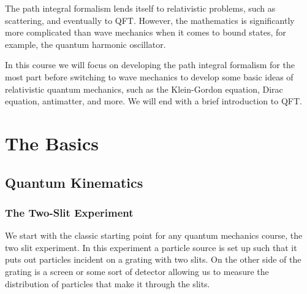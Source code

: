 \documentclass[fleqn]{NotesClass}
\begin{document}
    The path integral formalism lends itself to relativistic problems, such as scattering, and eventually to QFT.
    However, the mathematics is significantly more complicated than wave mechanics when it comes to bound states, for example, the quantum harmonic oscillator.
    
    In this course we will focus on developing the path integral formalism for the most part before switching to wave mechanics to develop some basic ideas of relativistic quantum mechanics, such as the Klein-Gordon equation, Dirac equation, antimatter, and more.
    We will end with a brief introduction to QFT.
    
    \part{The Basics}
    \chapter{Quantum Kinematics}
    \section{The Two-Slit Experiment}
    We start with the classic starting point for any quantum mechanics course, the two slit experiment.
    In this experiment a particle source is set up such that it puts out particles incident on a grating with two slits.
    On the other side of the grating is a screen or some sort of detector allowing us to measure the distribution of particles that make it through the slits.
    
\end{document}

